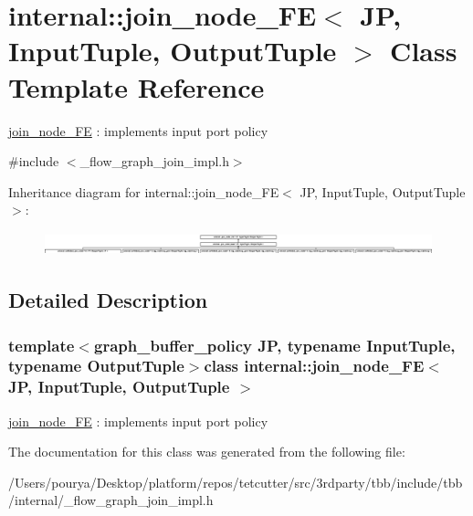 \hypertarget{classinternal_1_1join__node__FE}{}\section{internal\+:\+:join\+\_\+node\+\_\+\+F\+E$<$ J\+P, Input\+Tuple, Output\+Tuple $>$ Class Template Reference}
\label{classinternal_1_1join__node__FE}


\hyperlink{classinternal_1_1join__node__FE}{join\+\_\+node\+\_\+\+F\+E} \+: implements input port policy  




{\ttfamily \#include $<$\+\_\+flow\+\_\+graph\+\_\+join\+\_\+impl.\+h$>$}

Inheritance diagram for internal\+:\+:join\+\_\+node\+\_\+\+F\+E$<$ J\+P, Input\+Tuple, Output\+Tuple $>$\+:\begin{figure}[H]
\begin{center}
\leavevmode
\includegraphics[height=0.697095cm]{classinternal_1_1join__node__FE}
\end{center}
\end{figure}


\subsection{Detailed Description}
\subsubsection*{template$<$graph\+\_\+buffer\+\_\+policy J\+P, typename Input\+Tuple, typename Output\+Tuple$>$class internal\+::join\+\_\+node\+\_\+\+F\+E$<$ J\+P, Input\+Tuple, Output\+Tuple $>$}

\hyperlink{classinternal_1_1join__node__FE}{join\+\_\+node\+\_\+\+F\+E} \+: implements input port policy 

The documentation for this class was generated from the following file\+:\begin{DoxyCompactItemize}
\item 
/\+Users/pourya/\+Desktop/platform/repos/tetcutter/src/3rdparty/tbb/include/tbb/internal/\+\_\+flow\+\_\+graph\+\_\+join\+\_\+impl.\+h\end{DoxyCompactItemize}
